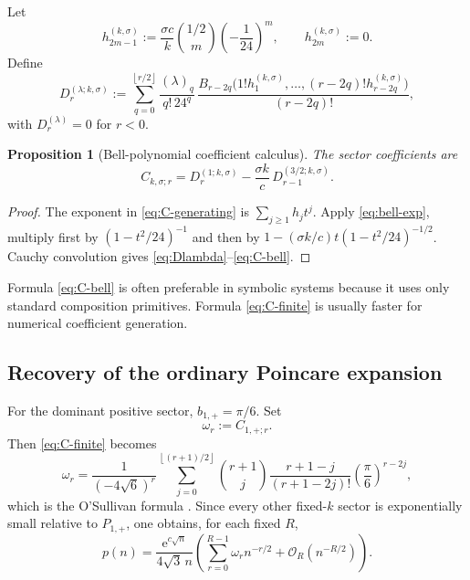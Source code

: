 \documentclass[11pt,a4paper]{article}
\numberwithin{equation}{section}
\newtheorem{proposition}[theorem]{Proposition}
\theoremstyle{definition}
\theoremstyle{remark}
\newcommand{\e}{\mathrm e}
\newcommand{\bigO}{\mathcal O}
\newcommand{\floor}[1]{\left\lfloor#1\right\rfloor}
\begin{document}
Let
\begin{equation}\label{eq:h-coeffs}
 h_{2m-1}^{(k,\sigma)}:=
 \frac{\sigma c}{k}\binom{1/2}{m}\left(-\frac1{24}\right)^m,
 \qquad h_{2m}^{(k,\sigma)}:=0.
\end{equation}
Define
\begin{equation}\label{eq:Dlambda}
 D_r^{(\lambda;k,\sigma)}:=
 \sum_{q=0}^{\floor{r/2}}
 \frac{(\lambda)_q}{q!\,24^q}\,
 \frac{B_{r-2q}
 \bigl(1!h_1^{(k,\sigma)},\ldots,(r-2q)!h_{r-2q}^{(k,\sigma)}\bigr)}
 {(r-2q)!},
\end{equation}
with $D_r^{(\lambda)}=0$ for $r<0$.

\begin{proposition}[Bell-polynomial coefficient calculus]\label{prop:C-bell}
The sector coefficients are
\begin{equation}\label{eq:C-bell}
 \boxed{
 C_{k,\sigma;r}=D_r^{(1;k,\sigma)}
 -\frac{\sigma k}{c}\,D_{r-1}^{(3/2;k,\sigma)}.}
\end{equation}
\end{proposition}

\begin{proof}
The exponent in \eqref{eq:C-generating} is
$\sum_{j\geq1}h_jt^j$.  Apply \eqref{eq:bell-exp}, multiply first by
$(1-t^2/24)^{-1}$ and then by
$1-(\sigma k/c)t(1-t^2/24)^{-1/2}$.  Cauchy convolution gives
\eqref{eq:Dlambda}--\eqref{eq:C-bell}.
\end{proof}

Formula \eqref{eq:C-bell} is often preferable in symbolic systems because it
uses only standard composition primitives.  Formula \eqref{eq:C-finite} is
usually faster for numerical coefficient generation.

\subsection{Recovery of the ordinary Poincare expansion}

For the dominant positive sector, $b_{1,+}=\pi/6$.  Set
\begin{equation}\label{eq:omega-def}
 \omega_r:=C_{1,+;r}.
\end{equation}
Then \eqref{eq:C-finite} becomes
\begin{equation}\label{eq:omega}
 \omega_r=\frac1{(-4\sqrt6)^r}
 \sum_{j=0}^{\floor{(r+1)/2}}
 \binom{r+1}{j}\frac{r+1-j}{(r+1-2j)!}
 \left(\frac\pi6\right)^{r-2j},
\end{equation}
which is the O'Sullivan formula \cite{OSullivan2023,BanerjeeEtAl2022}.  Since every other fixed-$k$ sector is
exponentially small relative to $P_{1,+}$, one obtains, for each fixed $R$,
\begin{equation}\label{eq:poincare}
 p(n)=\frac{\e^{c\sqrt n}}{4\sqrt3\,n}
 \left(\sum_{r=0}^{R-1}\omega_r n^{-r/2}
 +\bigO_R(n^{-R/2})\right).
\end{equation}
\end{document}
